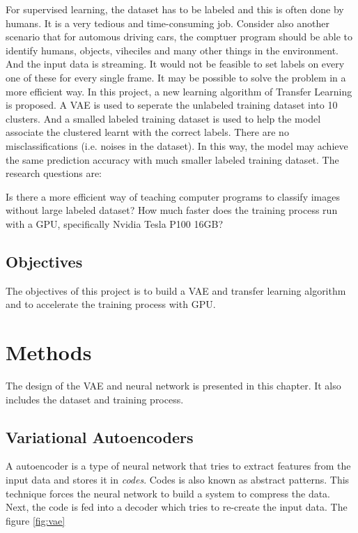 \documentclass[11pt,a4paper]{report}
\begin{document}
For supervised learning, the dataset has to be labeled and this is often done by humans. It is a very tedious and time-consuming job. Consider also another scenario that for automous driving cars, the comptuer program should be able to identify humans, objects, viheciles and many other things in the environment. And the input data is streaming. It would not be feasible to set labels on every one of these for every single frame. It may be possible to solve the problem in a more efficient way. In this project, a new learning algorithm of Transfer Learning is proposed. A VAE is used to seperate the unlabeled training dataset into 10 clusters. And a smalled labeled training dataset is used to help the model associate the clustered learnt with the correct labels. There are no misclassifications (i.e. noises in the dataset). In this way, the model may achieve the same prediction accuracy with much smaller labeled training dataset. The research questions are:

Is there a more efficient way of teaching computer programs to classify images without large labeled dataset?
How much faster does the training process run with a GPU, specifically Nvidia Tesla P100 16GB?


\section{Objectives}
\label{sec:name}

The objectives of this project is to build a VAE and transfer learning algorithm and to accelerate the training process with GPU.


\chapter{Methods}
\label{cap:method}

The design of the VAE and neural network is presented in this chapter. It also includes the dataset and training process.

\section{Variational Autoencoders}
\label{sec:vae}

A autoencoder is a type of neural network that tries to extract features from the input data and stores it in \textit{codes}. Codes is also known as abstract patterns. This technique forces the neural network to build a system to compress the data. Next, the code is fed into a decoder which tries to re-create the input data. The figure \ref{fig:vae}
\end{document}
